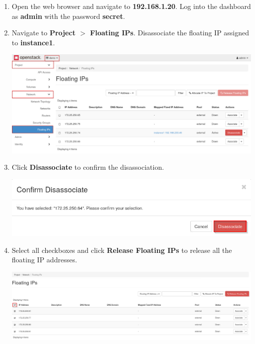 \documentclass[letterpaper, 12pt]{article}
\begin{document}
\begin{enumerate}
    \item Open the web browser and navigate to \textbf{192.168.1.20}. Log into the dashboard as \textbf{admin} with the
    password \textbf{secret}.

    \item Navigate to \textbf{Project $>$ Floating IPs}. Disassociate the floating IP assigned to \textbf{instance1}.

    \begin{center}
        \includegraphics[width=\linewidth]{images/part4/step21.png}
    \end{center}

    \item Click \textbf{Disassociate} to confirm the disassociation.
    
    \begin{center}
        \includegraphics[width=\linewidth]{images/part4/step22.png}
    \end{center}

    \item Select all checkboxes and click \textbf{Release Floating IPs} to release all the floating IP addresses.
    
    \begin{center}
        \includegraphics[width=\linewidth]{images/part4/step23.png}
    \end{center}


\end{enumerate}
\end{document}
